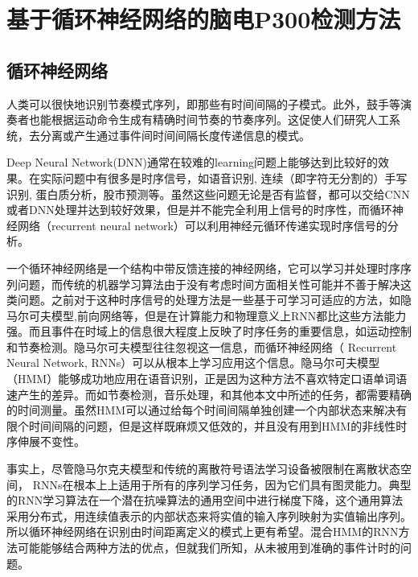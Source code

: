 \chapter{基于循环神经网络的脑电P300检测方法}

\section{循环神经网络}

人类可以很快地识别节奏模式序列，即那些有时间间隔的子模式。此外，鼓手等演奏者也能根据运动命令生成有精确时间节奏的节奏序列。这促使人们研究人工系统，去分离或产生通过事件间时间间隔长度传递信息的模式。

Deep Neural Network(DNN)通常在较难的learning问题上能够达到比较好的效果。在实际问题中有很多是时序信号，如语音识别, 连续（即字符无分割的）手写识别, 蛋白质分析，股市预测等。虽然这些问题无论是否有监督，都可以交给CNN或者DNN处理并达到较好效果\cite{abdel2014convolutional,lecun1995convolutional,ciresan2011convolutional,lecun1994word ,lauer2007trainable,baldi1996hybrid,zhu2014stock}，但是并不能完全利用上信号的时序性，而循环神经网络（recurrent neural network）可以利用神经元循环传递实现时序信号的分析。

一个循环神经网络是一个结构中带反馈连接的神经网络，它可以学习并处理时序序列问题，而传统的机器学习算法由于没有考虑时间方面相关性可能并不善于解决这类问题。之前对于这种时序信号的处理方法是一些基于可学习可适应的方法，如隐马尔可夫模型\cite{eddy1996hidden},前向网络等，但是在计算能力和物理意义上RNN都比这些方法能力强。而且事件在时域上的信息很大程度上反映了时序任务的重要信息，如运动控制和节奏检测。隐马尔可夫模型往往忽视这一信息，而循环神经网络（ Recurrent Neural Network, RNNs）可以从根本上学习应用这个信息。隐马尔可夫模型（HMM）能够成功地应用在语音识别，正是因为这种方法不喜欢特定口语单词语速产生的差异。而如节奏检测，音乐处理，和其他本文中所述的任务，都需要精确的时间测量。虽然HMM可以通过给每个时间间隔单独创建一个内部状态来解决有限个时间间隔的问题，但是这样既麻烦又低效的，并且没有用到HMM的非线性时序伸展不变性。

事实上，尽管隐马尔克夫模型和传统的离散符号语法学习设备被限制在离散状态空间， RNNs在根本上上适用于所有的序列学习任务，因为它们具有图灵能力\cite{siegelmann1995computational}。典型的RNN学习算法在一个潜在抗噪算法的通用空间中进行梯度下降\cite{pearlmutter1995gradient}，这个通用算法采用分布式，用连续值表示的内部状态来将实值的输入序列映射为实值输出序列。所以循环神经网络在识别由时间距离定义的模式上更有希望。混合HMM的RNN方法\cite{bengio1995input}可能能够结合两种方法的优点，但就我们所知，从未被用到准确的事件计时的问题。

